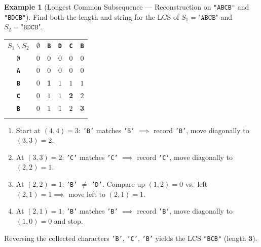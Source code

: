 \documentclass[11pt,a4paper]{article}
\theoremstyle{definition}
\newtheorem{example}{Example}[section]
\begin{document}
\begin{example}[Longest Common Subsequence --- Reconstruction on \texttt{"ABCB"} and \texttt{"BDCB"}]
Find both the length and string for the LCS of $S_1 = \texttt{"ABCB"}$ and $S_2 = \texttt{"BDCB"}$.

\begin{center}
\begingroup\small{}
\begin{tabular}{cccccc}
\arrayrulecolor{primaryblue}\toprule[1.1pt]
\rowcolor{primaryblue!10}
\textcolor{primaryblue}{\textbf{$S_1 \backslash S_2$}} & \textcolor{primaryblue}{\textbf{$\emptyset$}} & \textcolor{primaryblue}{\textbf{\texttt{B}}} & \textcolor{primaryblue}{\textbf{\texttt{D}}} & \textcolor{primaryblue}{\textbf{\texttt{C}}} & \textcolor{primaryblue}{\textbf{\texttt{B}}} \\
\arrayrulecolor{codeframe}\midrule[0.6pt]
\textbf{$\emptyset$} & $0$ & $0$ & $0$ & $0$ & $0$ \\
\textbf{\texttt{A}} & $0$ & $0$ & $0$ & $0$ & $0$ \\
\textbf{\texttt{B}} & $0$ & \textbf{1} & $1$ & $1$ & $1$ \\
\textbf{\texttt{C}} & $0$ & $1$ & $1$ & \textbf{2} & $2$ \\
\textbf{\texttt{B}} & $0$ & $1$ & $1$ & $2$ & \textbf{3} \\
\arrayrulecolor{primaryblue}\bottomrule[1.1pt]
\end{tabular}
\endgroup
\end{center}

\begin{enumerate}
    \item Start at $(4, 4) = 3$: \texttt{'B'} matches \texttt{'B'} $\implies$ record \texttt{'B'}, move diagonally to $(3, 3) = 2$.
    \item At $(3, 3) = 2$: \texttt{'C'} matches \texttt{'C'} $\implies$ record \texttt{'C'}, move diagonally to $(2, 2) = 1$.
    \item At $(2, 2) = 1$: \texttt{'B'} $\neq$ \texttt{'D'}. Compare up $(1, 2) = 0$ vs.\ left $(2, 1) = 1 \implies$ move left to $(2, 1) = 1$.
    \item At $(2, 1) = 1$: \texttt{'B'} matches \texttt{'B'} $\implies$ record \texttt{'B'}, move diagonally to $(1, 0) = 0$ and stop.
\end{enumerate}
Reversing the collected characters \texttt{'B'}, \texttt{'C'}, \texttt{'B'} yields the LCS \texttt{"BCB"} (length $\mathbf{3}$).
\end{example}
\end{document}

